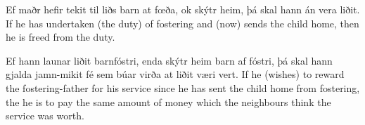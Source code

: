 \begin{paracol}{2}
    Ef maðr hefir tekit til liðs barn at fœða, ok skýtr heim, þá skal hann án vera liðit.
    \switchcolumn
    If he has undertaken (the duty) of fostering and (now) sends the child home, then he is freed from the duty.
\end{paracol}

\begin{paracol}{2}
    Ef hann launar liðit barnfóstri, enda skýtr heim barn af fóstri, þá skal hann gjalda jamn-mikit fé sem búar virða at liðit væri vert.
    \switchcolumn
    If he (wishes) to reward the fostering-father for his service since he has sent the child home from fostering, the he is to pay the same amount of money which the neighbours think the service was worth.
\end{paracol}

